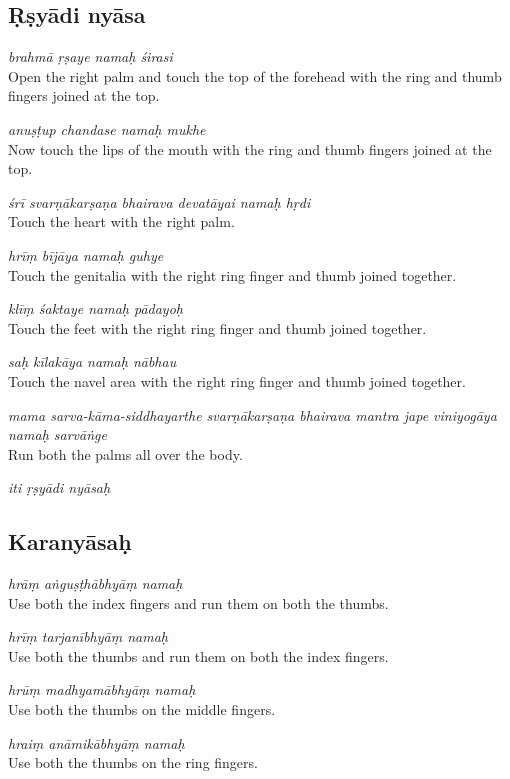 \documentclass[11pt,oneside,a4paper]{article}
\newenvironment{shloka}[1]
  {\bigskip\center#1\varwidth{\linewidth}}
  {\endvarwidth\endcenter\bigskip}
\newcommand{\tl}[1]{\emph{#1}}
\begin{document}
\subsection{Ṛṣyādi nyāsa}

\tl{brahmā ṛṣaye namaḥ śirasi}\\
Open the right palm and touch the top of the forehead with the ring and thumb
fingers joined at the top.

\tl{anuṣṭup chandase namaḥ mukhe}\\
Now touch the lips of the mouth with the ring and thumb fingers joined
at the top.

\tl{śrī svarṇākarṣaṇa bhairava devatāyai namaḥ hṛdi}\\
Touch the heart with the right palm.

\tl{hrīṃ bījāya namaḥ guhye}\\
Touch the genitalia with the right ring finger and thumb joined together.

\tl{klīṃ śaktaye namaḥ pādayoḥ}\\
Touch the feet with the right ring finger and thumb joined together.

\tl{saḥ kīlakāya namaḥ nābhau}\\
Touch the navel area with the right ring finger and thumb joined together.

\tl{mama sarva-kāma-siddhayarthe svarṇākarṣaṇa bhairava mantra jape viniyogāya
namaḥ sarvāṅge}\\
Run both the palms all over the body.

\begin{shloka}\itshape
  iti ṛṣyādi nyāsaḥ
\end{shloka}

\subsection{Karanyāsaḥ}

\tl{hrāṃ aṅguṣṭhābhyāṃ namaḥ}\\
Use both the index fingers and run them on both the thumbs.

\tl{hrīṃ tarjanībhyāṃ namaḥ}\\
Use both the thumbs and run them on both the index fingers.

\tl{hrūṃ madhyamābhyāṃ namaḥ}\\
Use both the thumbs on the middle fingers.

\tl{hraiṃ anāmikābhyāṃ namaḥ}\\
Use both the thumbs on the ring fingers.
\end{document}
